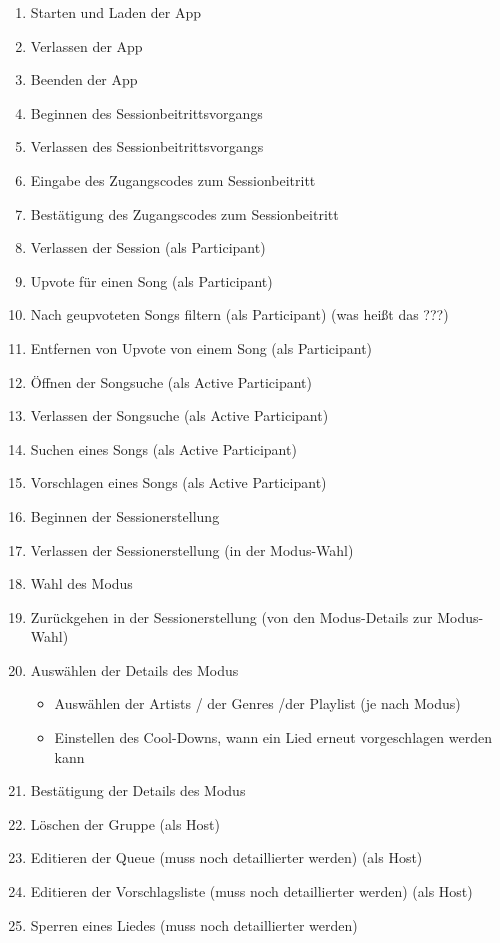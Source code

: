 \documentclass[oneside, ngerman]{sdqtechreport}
\begin{document}
\begin{enumerate}
    \item Starten und Laden der App
    \item Verlassen der App
    \item Beenden der App
    \item Beginnen des Sessionbeitrittsvorgangs
    \item Verlassen des Sessionbeitrittsvorgangs
    \item Eingabe des Zugangscodes zum Sessionbeitritt
    \item Bestätigung des Zugangscodes zum Sessionbeitritt
    \item Verlassen der Session (als Participant)
    \item Upvote für einen Song (als Participant)
    \item Nach geupvoteten Songs filtern (als Participant) (was heißt das ???)
    \item Entfernen von Upvote von einem Song (als Participant)
    \item Öffnen der Songsuche (als Active Participant)
    \item Verlassen der Songsuche (als Active Participant)
    \item Suchen eines Songs (als Active Participant)
    \item Vorschlagen eines Songs (als Active Participant)
    \item Beginnen der Sessionerstellung
    \item Verlassen der Sessionerstellung (in der Modus-Wahl)
    \item Wahl des Modus
    \item Zurückgehen in der Sessionerstellung (von den Modus-Details zur Modus-Wahl)
    \item Auswählen der Details des Modus
    \begin{itemize}
        \item Auswählen der Artists / der Genres /der Playlist (je nach Modus)
        \item Einstellen des Cool-Downs, wann ein Lied erneut vorgeschlagen werden kann
    \end{itemize}
    \item Bestätigung der Details des Modus
    \item Löschen der Gruppe (als Host)
    \item Editieren der Queue (muss noch detaillierter werden) (als Host)
    \item Editieren der Vorschlagsliste (muss noch detaillierter werden) (als Host)
    \item Sperren eines Liedes (muss noch detaillierter werden)
\end{enumerate}
\end{document}

